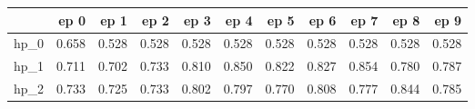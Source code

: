 \begin{tabular}{lrrrrrrrrrr}
\toprule
{} &   ep 0 &   ep 1 &   ep 2 &   ep 3 &   ep 4 &   ep 5 &   ep 6 &   ep 7 &   ep 8 &   ep 9 \\
\midrule
hp\_0 &  0.658 &  0.528 &  0.528 &  0.528 &  0.528 &  0.528 &  0.528 &  0.528 &  0.528 &  0.528 \\
hp\_1 &  0.711 &  0.702 &  0.733 &  0.810 &  0.850 &  0.822 &  0.827 &  0.854 &  0.780 &  0.787 \\
hp\_2 &  0.733 &  0.725 &  0.733 &  0.802 &  0.797 &  0.770 &  0.808 &  0.777 &  0.844 &  0.785 \\
\bottomrule
\end{tabular}
